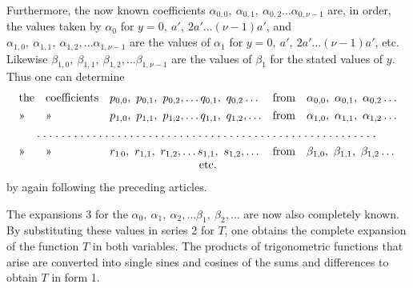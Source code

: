 \begin{landscape}
\par\noindent\hspace*{\parindent}Furthermore, the now known coefficients \(\alpha_{0,0},\ \alpha_{0,1},\ \alpha_{0,2}\ldots\alpha_{0,\nu-1}\) are, in order, the values taken by \(\alpha_0\) for \(y=0,\ a',\ 2a'\ldots(\nu-1)a'\), and \(\alpha_{1,0},\ \alpha_{1,1},\ \alpha_{1,2},\ldots\alpha_{1,\nu-1}\) are the values of \(\alpha_1\) for \(y=0,\ a',\ 2a'\ldots(\nu-1)a'\), etc. Likewise \(\beta_{1,0},\ \beta_{1,1},\ \beta_{1,2},\ldots\beta_{1,\nu-1}\) are the values of \(\beta_1\) for the stated values of \(y\). Thus one can determine
\[
\begin{array}{@{}ll@{\quad}l@{\quad}l@{\quad}l@{}}
\text{the}&\text{coefficients}&p_{0,0},\ p_{0,1},\ p_{0,2},\ldots q_{0,1},\ q_{0,2}\ldots&\text{from}&\alpha_{0,0},\ \alpha_{0,1},\ \alpha_{0,2}\ldots\\[4pt]
\text{»}&\text{»}&p_{1,0},\ p_{1,1},\ p_{1,2},\ldots q_{1,1},\ q_{1,2},\ldots&\text{from}&\alpha_{1,0},\ \alpha_{1,1},\ \alpha_{1,2}\ldots\\[4pt]
\multicolumn{5}{@{}c@{}}{\VFiveTenPoints\VFiveTenPoints\VFiveTenPoints\VFiveTenPoints\VFiveTenPoints\VFivePoint\VFivePoint\VFivePoint\VFivePoint\VFivePoint}\\[4pt]
\text{»}&\text{»}&r_{1\,0},\ r_{1,1},\ r_{1,2},\ldots s_{1,1},\ s_{1,2},\ldots&\text{from}&\beta_{1,0},\ \beta_{1,1},\ \beta_{1,2}\ldots\\
\multicolumn{5}{c}{\text{etc.}}
\end{array}
\]
by again following the preceding articles.

\par\noindent\hspace*{\parindent}The expansions 3 for the \(\alpha_0,\ \alpha_1,\ \alpha_2,\ldots\beta_1,\ \beta_2,\ldots\) are now also completely known. By substituting these values in series 2 for \(T\), one obtains the complete expansion of the function \(T\) in both variables. The products of trigonometric functions that arise are converted into single sines and cosines of the sums and differences to obtain \(T\) in form 1.


\end{landscape}
